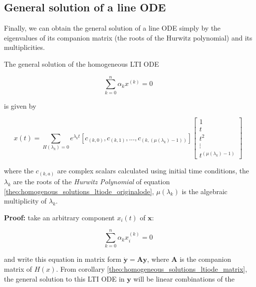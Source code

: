 \subsection{General solution of a line ODE} %

	Finally, we can obtain the general solution of a line ODE simply by the eigenvalues of its companion matrix (the roots of the Hurwitz polynomial) and its multiplicities.

\begin{theorem} \label{theo:homogeneous_solutions_ltiode_hurwitz} %
	The general solution of the homogeneous LTI ODE

\begin{equation} \sum\limits_{k=0}^n \alpha_k x^{\left(k\right)} = 0 \label{theo:homogenous_solutions_ltiode_originalode}\end{equation}

	is given by

\begin{equation} x(t) = \sum\limits_{H\left(\lambda_k\right) = 0} e^{\lambda_k t}\left[c_{(k,0)},c_{(k,1)},...,c_{(k,\left(\mu\left(\lambda_k\right)-1\right))}\right]\left[\begin{array}{c} 1 \\ t \\ t^2 \\ \vdots \\t^{(\mu\left(\lambda_k\right)-1)} \end{array}\right] \label{theo:homogenous_solutions_ltiode_originalode_ithsol}  \end{equation}

	\noindent where the $c_{(k,a)}$ are complex scalars calculated using initial time conditions, the $\lambda_k$ are the roots of the \textit{Hurwitz Polynomial} of equation \eqref{theo:homogenous_solutions_ltiode_originalode}, $\mu\left(\lambda_k\right)$ is the algebraic multiplicity of $\lambda_k$. 
\end{theorem}
\noindent \textbf{Proof:} take an arbitrary component $x_i(t)$ of $\mathbf{x}$:

\begin{equation} \sum\limits_{k=0}^n \alpha_k x_i^{\left(k\right)} = 0 \label{theo:homogenous_solutions_ltiode_originalode_ith}\end{equation}

	and write this equation in matrix form $\dot{\mathbf{y}} = \mathbf{Ay}$, where $\mathbf{A}$ is the companion matrix of $H(x)$. From corollary \ref{theo:homogeneous_solutions_ltiode_matrix}, the general solution to this LTI ODE in $\mathbf{y}$ will be linear combinations of the

